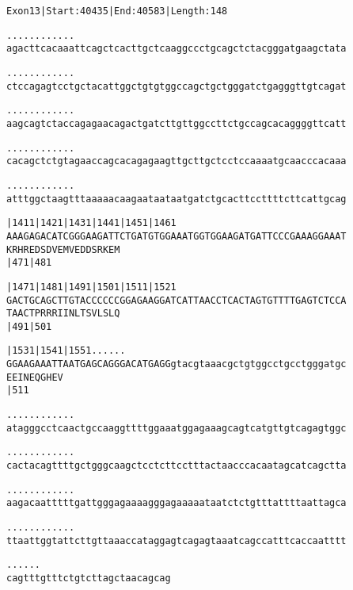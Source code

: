 \documentclass{article}
\begin{document}
\begin{alltt}
Exon 13 | Start: 40435 | End: 40583 | Length: 148

.    .    .    .    .    .    .    .    .    .    .    .    
agacttcacaaattcagctcacttgctcaaggccctgcagctctacgggatgaagctata

.    .    .    .    .    .    .    .    .    .    .    .    
ctccagagtcctgctacattggctgtgtggccagctgctgggatctgagggttgtcagat

.    .    .    .    .    .    .    .    .    .    .    .    
aagcagtctaccagagaacagactgatcttgttggccttctgccagcacaggggttcatt

.    .    .    .    .    .    .    .    .    .    .    .    
cacagctctgtagaaccagcacagagaagttgcttgctcctccaaaatgcaacccacaaa

.    .    .    .    .    .    .    .    .    .    .    .    
atttggctaagtttaaaaacaagaataataatgatctgcacttccttttcttcattgcag

 |1411     |1421     |1431     |1441     |1451     |1461    
AAAGAGACATCGGGAAGATTCTGATGTGGAAATGGTGGAAGATGATTCCCGAAAGGAAAT
 K  R  H  R  E  D  S  D  V  E  M  V  E  D  D  S  R  K  E  M 
 |471                          |481                         

 |1471     |1481     |1491     |1501     |1511     |1521    
GACTGCAGCTTGTACCCCCCGGAGAAGGATCATTAACCTCACTAGTGTTTTGAGTCTCCA
 T  A  A  C  T  P  R  R  R  I  I  N  L  T  S  V  L  S  L  Q 
 |491                          |501                         

 |1531     |1541     |1551       .    .    .    .    .    . 
GGAAGAAATTAATGAGCAGGGACATGAGGgtacgtaaacgctgtggcctgcctgggatgc
 E  E  I  N  E  Q  G  H  E  V                               
 |511                                                       

   .    .    .    .    .    .    .    .    .    .    .    . 
atagggcctcaactgccaaggttttggaaatggagaaagcagtcatgttgtcagagtggc

   .    .    .    .    .    .    .    .    .    .    .    . 
cactacagttttgctgggcaagctcctcttcctttactaacccacaatagcatcagctta

   .    .    .    .    .    .    .    .    .    .    .    . 
aagacaatttttgattgggagaaaagggagaaaaataatctctgtttattttaattagca

   .    .    .    .    .    .    .    .    .    .    .    . 
ttaattggtattcttgttaaaccataggagtcagagtaaatcagccatttcaccaatttt

\end{alltt}
\newpage
\begin{alltt}
   .    .    .    .    .    .
cagtttgtttctgtcttagctaacagcag
\end{alltt}
\end{document}

